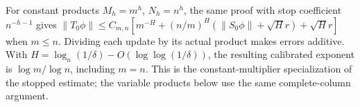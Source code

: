For constant products $M_h=m^h$, $N_h=n^h$, the same proof with stop coefficient $n^{-h-1}$ gives
$\|T_0\phi\|\le C_{m,n}[m^{-H}+(n/m)^H(\|S_0\phi\|+\sqrt H r)+\sqrt H r]$ when $m\le n$. Dividing each update by its actual product makes errors additive. With $H=\log_n(1/\delta)-O(\log\log(1/\delta))$, the resulting calibrated exponent is $\log m/\log n$, including $m=n$. This is the constant-multiplier specialization of the stopped estimate; the variable products below use the same complete-column argument.
